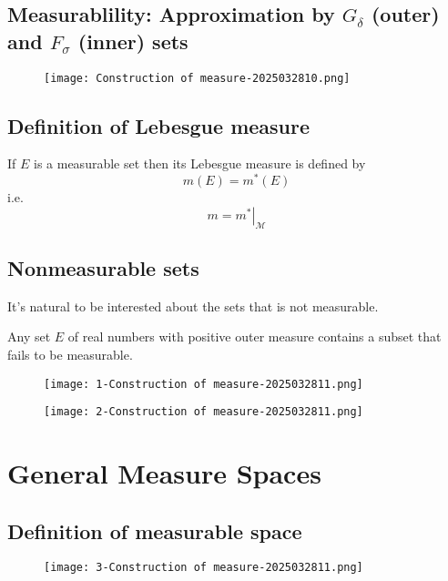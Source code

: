 \subsection{Measurablility: Approximation by \texorpdfstring{$G_{\delta}$}{G_delta} (outer) and \texorpdfstring{$F_{\sigma}$}{F_sigma} (inner) sets}

\begin{figure}[H]
\centering
\texttt{[image: Construction of measure-2025032810.png]}
\label{}
\end{figure}

\subsection{Definition of Lebesgue measure}

If $E$ is a measurable set then its Lebesgue measure is defined by
\[
m(E)=m^{*}(E)
\]
i.e.
\[
m=\left.m^{*}\right|_{\mathcal{M}}
\]
\subsection{Nonmeasurable sets}

It's natural to be interested about the sets that is not measurable.

\begin{theorem}[Vitali]
Any set $E$ of real numbers with positive outer measure contains a subset that fails to be measurable.
\end{theorem}
\begin{figure}[H]
\centering
\texttt{[image: 1-Construction of measure-2025032811.png]}
\label{}
\end{figure}

\begin{figure}[H]
\centering
\texttt{[image: 2-Construction of measure-2025032811.png]}
\label{}
\end{figure}

\section{General Measure Spaces}

\subsection{Definition of measurable space}

\begin{figure}[H]
\centering
\texttt{[image: 3-Construction of measure-2025032811.png]}
\label{}
\end{figure}

